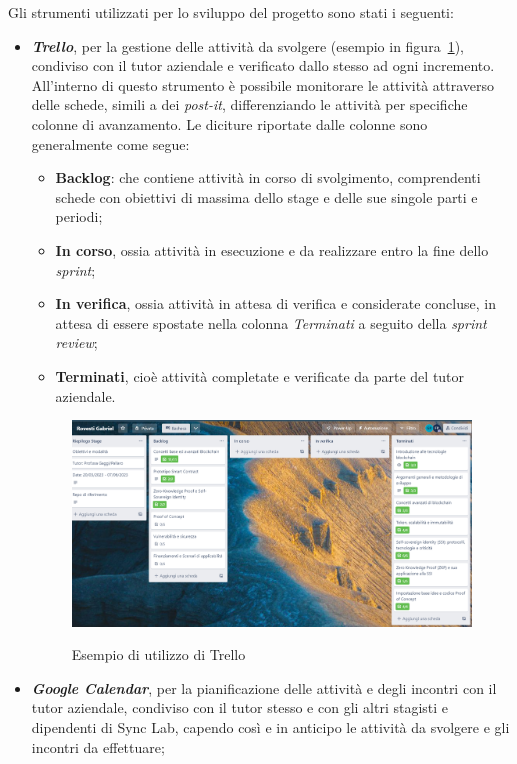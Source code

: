 Gli strumenti utilizzati per lo sviluppo del progetto sono stati i seguenti:
\begin{itemize}
    \item{\textit{\textbf{Trello}}}, per la gestione delle attività da svolgere (esempio in figura~\ref{fig:trello}), condiviso con il tutor aziendale e verificato dallo stesso ad ogni incremento.
    All'interno di questo strumento è possibile monitorare le attività attraverso delle schede, simili a dei \textit{post-it}, differenziando le attività per specifiche colonne di avanzamento.
    Le diciture riportate dalle colonne sono generalmente come segue:
    \begin{itemize}
        \item{\textbf{Backlog}}: che contiene attività in corso di svolgimento, comprendenti schede con obiettivi di massima dello stage e delle sue singole parti e periodi;
        \item{\textbf{In corso}}, ossia attività in esecuzione e da realizzare entro la fine dello \textit{sprint};
        \item{\textbf{In verifica}}, ossia attività in attesa di verifica e considerate concluse, in attesa di essere spostate nella colonna \textit{Terminati} a seguito della \textit{sprint review};
        \item{\textbf{Terminati}}, cioè attività completate e verificate da parte del tutor aziendale.
    \end{itemize} 
    \begin{figure}[h]
        \centering
        \includegraphics[width=1\textwidth, alt={Esempio di utilizzo di Trello}]{immagini/trello.png}
        \caption{Esempio di utilizzo di Trello}\label{fig:trello}
    \end{figure}

    \item{\textit{\textbf{Google Calendar}}}, per la pianificazione delle attività e degli incontri con il tutor aziendale, condiviso con il tutor stesso e con gli altri stagisti 
    e dipendenti di Sync Lab, capendo così e in anticipo le attività da svolgere e gli incontri da effettuare;
    

\end{itemize}
